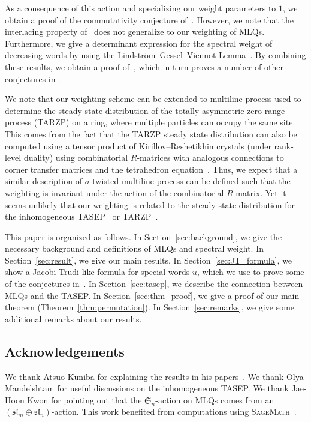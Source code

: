 \documentclass[reqno]{amsart}%
\newcommand{\0}{\phantom{c}}
\theoremstyle{plain}
\theoremstyle{definition}
\numberwithin{equation}{section}
\begin{document}
As a consequence of this action and specializing our weight parameters to $1$,
we obtain a proof of the commutativity conjecture of~\cite{AAMP}. However, we
note that the interlacing property of~\cite{AAMP} does not generalize to our
weighting of MLQs. Furthermore, we give a determinant expression for the
spectral weight of decreasing words by using the Lindstr\"om--Gessel--Viennot
Lemma~\cite{GV85,Lindstrom73}. By combining these results, we obtain a proof
of~\cite[Conj.~3.10]{AasLin17}, which in turn proves a number of other
conjectures in~\cite{AasLin17}.

We note that our weighting scheme can be extended to multiline process used to
determine the steady state distribution of the totally asymmetric zero range
process (TARZP) on a ring, where multiple particles can occupy the same site.
This comes from the fact that the TARZP steady state distribution can also be
computed using a tensor product of Kirillov--Reshetikhin crystals (under
rank-level duality) using combinatorial $R$-matrices with analogous
connections to corner transfer matrices and the tetrahedron
equation~\cite{KMO16TARZP,KMO16TARZPII}. Thus, we expect that a similar
description of $\sigma$-twisted multiline process can be defined such that the
weighting is invariant under the action of the combinatorial $R$-matrix. Yet
it seems unlikely that our weighting is related to the steady state
distribution for the inhomogeneous TASEP~\cite{AM13,AL14} or
TARZP~\cite{KMO16II}.

This paper is organized as follows. In Section~\ref{sec:background}, we give
the necessary background and definitions of MLQs and spectral weight. In
Section~\ref{sec:result}, we give our main results. In
Section~\ref{sec:JT_formula}, we show a Jacobi-Trudi like formula for special
words $u$, which we use to prove some of the conjectures in~\cite{AasLin17}.
In Section~\ref{sec:tasep}, we describe the connection between MLQs and the
TASEP. In Section~\ref{sec:thm_proof}, we give a proof of our main theorem
(Theorem~\ref{thm:permutation}). In Section~\ref{sec:remarks}, we give some
additional remarks about our results.

\subsection{Acknowledgements}

We thank Atsuo Kuniba for explaining the results in his
papers~\cite{KMO15,KMO16II,KMO16,KMO16TARZP,KMO16TARZPII}. We thank Olya
Mandelshtam for useful discussions on the inhomogeneous TASEP. We thank
Jae-Hoon Kwon for pointing out that the $\mathfrak{S}_{n}$-action on MLQs
comes from an $(\mathfrak{sl}_{m} \oplus\mathfrak{sl}_{n})$-action. This work
benefited from computations using \textsc{SageMath}~\cite{sage,combinat}.
\end{document}

